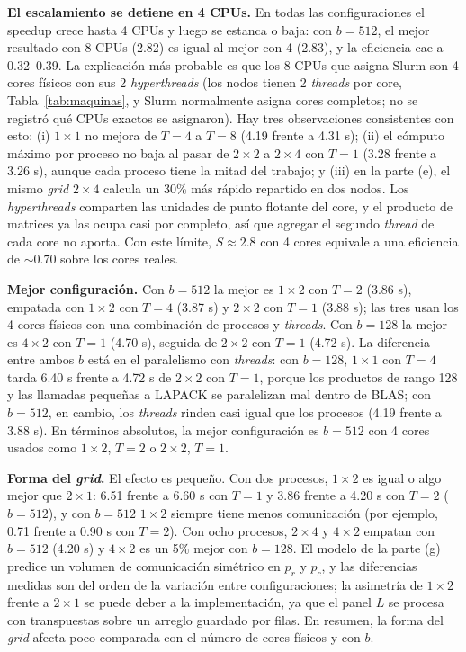 \documentclass[11pt,a4paper]{article}
\begin{document}
\textbf{El escalamiento se detiene en 4 CPUs.} En todas las configuraciones el speedup crece hasta 4 CPUs y luego se estanca o baja: con $b=512$, el mejor resultado con 8 CPUs (2.82) es igual al mejor con 4 (2.83), y la eficiencia cae a 0.32--0.39. La explicación más probable es que los 8 CPUs que asigna Slurm son 4 cores físicos con sus 2 \emph{hyperthreads} (los nodos tienen 2 \emph{threads} por core, Tabla~\ref{tab:maquinas}, y Slurm normalmente asigna cores completos; no se registró qué CPUs exactos se asignaron). Hay tres observaciones consistentes con esto: (i) $1\times1$ no mejora de $T=4$ a $T=8$ (4.19 frente a 4.31 s); (ii) el cómputo máximo por proceso no baja al pasar de $2\times2$ a $2\times4$ con $T=1$ (3.28 frente a 3.26 s), aunque cada proceso tiene la mitad del trabajo; y (iii) en la parte (e), el mismo \emph{grid} $2\times4$ calcula un 30\% más rápido repartido en dos nodos. Los \emph{hyperthreads} comparten las unidades de punto flotante del core, y el producto de matrices ya las ocupa casi por completo, así que agregar el segundo \emph{thread} de cada core no aporta. Con este límite, $S\approx2.8$ con 4 cores equivale a una eficiencia de $\sim0.70$ sobre los cores reales.

\textbf{Mejor configuración.} Con $b=512$ la mejor es $1\times2$ con $T=2$ (3.86 s), empatada con $1\times2$ con $T=4$ (3.87 s) y $2\times2$ con $T=1$ (3.88 s); las tres usan los 4 cores físicos con una combinación de procesos y \emph{threads}. Con $b=128$ la mejor es $4\times2$ con $T=1$ (4.70 s), seguida de $2\times2$ con $T=1$ (4.72 s). La diferencia entre ambos $b$ está en el paralelismo con \emph{threads}: con $b=128$, $1\times1$ con $T=4$ tarda 6.40 s frente a 4.72 s de $2\times2$ con $T=1$, porque los productos de rango 128 y las llamadas pequeñas a LAPACK se paralelizan mal dentro de BLAS; con $b=512$, en cambio, los \emph{threads} rinden casi igual que los procesos (4.19 frente a 3.88 s). En términos absolutos, la mejor configuración es $b=512$ con 4 cores usados como $1\times2$, $T=2$ o $2\times2$, $T=1$.

\textbf{Forma del \emph{grid}.} El efecto es pequeño. Con dos procesos, $1\times2$ es igual o algo mejor que $2\times1$: 6.51 frente a 6.60 s con $T=1$ y 3.86 frente a 4.20 s con $T=2$ ($b=512$), y con $b=512$ $1\times2$ siempre tiene menos comunicación (por ejemplo, 0.71 frente a 0.90 s con $T=2$). Con ocho procesos, $2\times4$ y $4\times2$ empatan con $b=512$ (4.20 s) y $4\times2$ es un 5\% mejor con $b=128$. El modelo de la parte (g) predice un volumen de comunicación simétrico en $p_r$ y $p_c$, y las diferencias medidas son del orden de la variación entre configuraciones; la asimetría de $1\times2$ frente a $2\times1$ se puede deber a la implementación, ya que el panel $L$ se procesa con transpuestas sobre un arreglo guardado por filas. En resumen, la forma del \emph{grid} afecta poco comparada con el número de cores físicos y con $b$.
\end{document}
